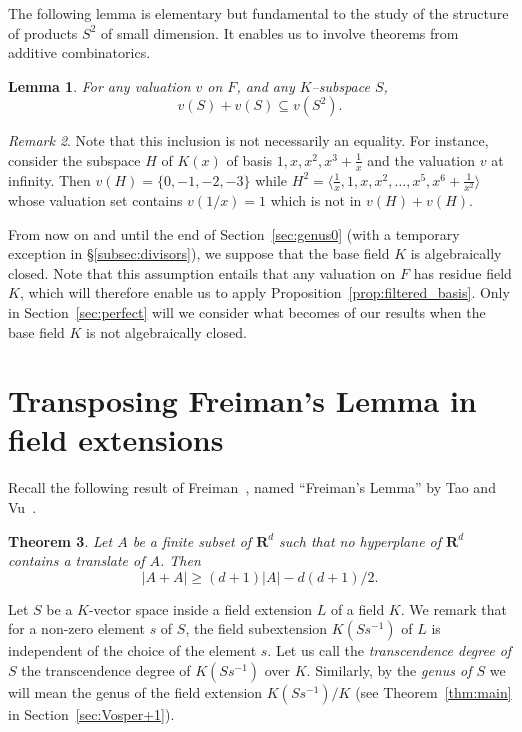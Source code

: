 \documentclass[10pt]{amsart}
\newtheorem{theo}{Theorem}[section]
\newtheorem{lemm}[theo]{Lemma}
\theoremstyle{definition}
\theoremstyle{remark}
\newtheorem{rema}[theo]{Remark}
\newcommand*\R{{\mathbf R}}
\renewcommand{\geq}{\geqslant}
\begin{document}
The following lemma is elementary but fundamental to the study of the structure of products $S^2$ of small dimension. It enables us to involve theorems from additive combinatorics.

\begin{lemm}\label{lem:v(H^2)}
For any valuation $v$ on $F$, and any $K$--subspace $S$,
\begin{equation}\label{eq:valuation_product}
v(S)+v(S) \subseteq v(S^2).
\end{equation}
\end{lemm}

\begin{rema}
Note that this inclusion is not necessarily an equality. For instance, consider the subspace $H$ of $K(x)$ of basis $1, x, x^2, x^3 + \frac 1 x$ and the valuation $v$ at infinity. Then $v(H)=\{0,-1,-2,-3\}$ while $H^2=\langle \frac 1 x, 1, x, x^2, \ldots, x^5, x^6+\frac 1 {x^2}
\rangle$ whose valuation set contains $v(1/x)=1$ which is not in $v(H)+v(H)$.
\end{rema}

From now on and until the end of Section~\ref{sec:genus0} (with a temporary exception in
\S \ref{subsec:divisors}), we suppose that the base field $K$ is algebraically closed. Note that this assumption entails that any valuation on $F$ has residue field $K$, which will therefore enable us to apply Proposition~\ref{prop:filtered_basis}. Only in Section~\ref{sec:perfect} will we consider what becomes of our results when the base field $K$ is not algebraically closed.

\section{Transposing Freiman's Lemma in field extensions}\label{sec:freiman}

Recall the following result of Freiman~\cite{Freiman}, named ``Freiman's Lemma'' by Tao and Vu~\cite[Lemma~5.13]{TaoVu}.

\begin{theo}\label{thm:freiman}
Let $A$ be a finite subset of $\R^d$ such that no hyperplane of $\R^d$ contains a translate of $A$. Then
\[
|A+A|\geq(d+1)|A| -d(d+1)/2.
\]
\end{theo}

Let $S$ be a $K$-vector space inside a field extension $L$ of a field $K$. We remark that for a non-zero element $s$ of $S$, the field subextension $K(Ss^{-1})$ of $L$ is independent of the choice of the element $s$. Let us call the \emph{transcendence degree of $S$} the transcendence degree of $K(Ss^{-1})$ over $K$. Similarly, by the \emph{genus of $S$} we will mean the genus of the field extension $K(Ss^{-1})/K$ (see Theorem~\ref{thm:main} in Section~\ref{sec:Vosper+1}).
\end{document}
